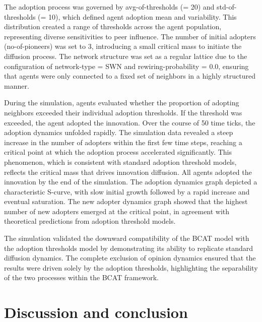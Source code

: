 \documentclass[10pt,letterpaper]{article}
\begin{document}
The adoption process was governed by avg-of-thresholds (= 20) and std-of-thresholds (= 10), which defined agent adoption mean and variability. This distribution created a range of thresholds across the agent population, representing diverse sensitivities to peer influence. The number of initial adopters (no-of-pioneers) was set to 3, introducing a small critical mass to initiate the diffusion process. The network structure was set as a regular lattice due to the configuration of network-type = SWN and rewiring-probability = 0.0, ensuring that agents were only connected to a fixed set of neighbors in a highly structured manner.

During the simulation, agents evaluated whether the proportion of adopting neighbors exceeded their individual adoption thresholds. If the threshold was exceeded, the agent adopted the innovation. Over the course of 50 time ticks, the adoption dynamics unfolded rapidly. The simulation data revealed a steep increase in the number of adopters within the first few time steps, reaching a critical point at which the adoption process accelerated significantly. This phenomenon, which is consistent with standard adoption threshold models, reflects the critical mass that drives innovation diffusion. All agents adopted the innovation by the end of the simulation. The adoption dynamics graph depicted a characteristic S-curve, with slow initial growth followed by a rapid increase and eventual saturation. The new adopter dynamics graph showed that the highest number of new adopters emerged at the critical point, in agreement with theoretical predictions from adoption threshold models.

The simulation validated the downward compatibility of the BCAT model with the adoption thresholds model by demonstrating its ability to replicate standard diffusion dynamics. The complete exclusion of opinion dynamics ensured that the results were driven solely by the adoption thresholds, highlighting the separability of the two processes within the BCAT framework.


\section*{Discussion and conclusion}
\end{document}
